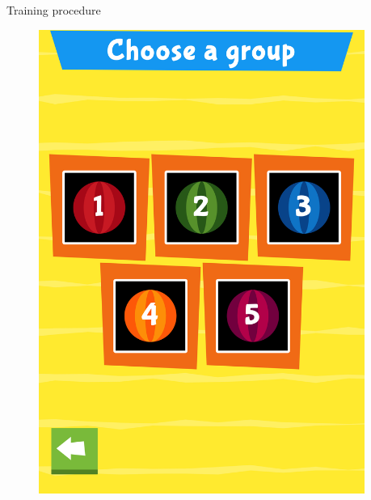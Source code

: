 \documentclass[final,xcolor={cmyk,hyperref}]{beamer}
\begin{document}
\begin{frame}[t]
\begin{columns}[t]
\begin{column}{0.4\linewidth}
\begin{block}{Training procedure}
\begin{figure}[h]
\begin{columns}
\begin{column}{\screenshotwidth}
    \includegraphics[width=\linewidth]{images/CALVin-screenshots/jpgs/choose_group}
  \end{column}
  \begin{column}{\screenshotwidth}

\end{column}
\end{columns}
\end{figure}
\end{block}
\end{column}
\end{columns}
\end{frame}
\end{document}
